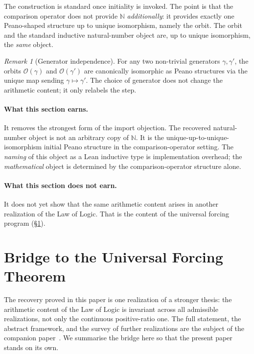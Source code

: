 \documentclass[11pt,a4paper]{article}
\theoremstyle{definition}
\theoremstyle{remark}
\newtheorem{remark}[theorem]{Remark}
\begin{document}
The construction is standard once initiality is invoked. The point is
that the comparison operator does not provide $\mathbb{N}$
\emph{additionally}: it provides exactly one Peano-shaped structure up
to unique isomorphism, namely the orbit. The orbit and the standard
inductive natural-number object are, up to unique isomorphism, the
\emph{same} object.

\begin{remark}[Generator independence]
\label{rem:gen-indep}
For any two non-trivial generators $\gamma, \gamma'$, the orbits
$\mathcal{O}(\gamma)$ and $\mathcal{O}(\gamma')$ are canonically
isomorphic as Peano structures via the unique map sending
$\gamma \mapsto \gamma'$. The choice of generator does not change the
arithmetic content; it only relabels the step.
\end{remark}

\paragraph{What this section earns.} It removes the strongest form of
the import objection. The recovered natural-number object is not an
arbitrary copy of $\mathbb{N}$. It is the unique-up-to-unique-isomorphism
initial Peano structure in the comparison-operator setting. The
\emph{naming} of this object as a Lean inductive type is implementation
overhead; the \emph{mathematical} object is determined by the
comparison-operator structure alone.

\paragraph{What this section does not earn.} It does not yet show that
the same arithmetic content arises in another realization of the Law
of Logic. That is the content of the universal forcing program
(\S\ref{sec:program}).

\section{Bridge to the Universal Forcing Theorem}
\label{sec:program}

The recovery proved in this paper is one realization of a stronger
thesis: the arithmetic content of the Law of Logic is invariant
across all admissible realizations, not only the continuous
positive-ratio one. The full statement, the abstract framework, and
the survey of further realizations are the subject of the companion
paper~\cite{Washburn2026UniversalForcing}. We summarise the bridge
here so that the present paper stands on its own.
\end{document}
